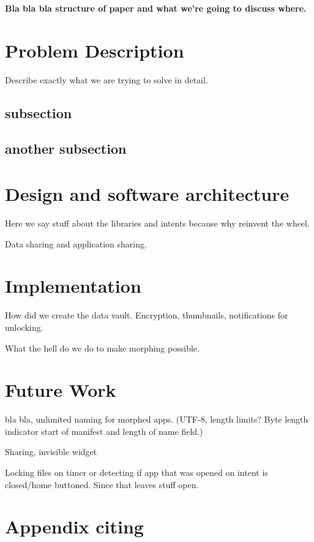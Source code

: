 \documentclass[twocolumn,english,compsoc,journal]{IEEEtran}
\begin{document}
\textbf{Bla bla bla structure of paper and what we're going to discuss
where.}


\section{Problem Description}

Describe exactly what we are trying to solve in detail.


\subsection{subsection}


\subsection{another subsection}


\section{Design and software architecture}

Here we say stuff about the libraries and intents because why reinvent
the wheel.

Data sharing and application sharing.


\section{Implementation}

How did we create the data vault. Encryption, thumbnails, notifications
for unlocking.

What the hell do we do to make morphing possible.


\section{Future Work}

bla bla, unlimited naming for morphed apps. (UTF-8, length limits?
Byte length indicator start of manifest and length of name field.)

Sharing, invisible widget

Locking files on timer or detecting if app that was opened on intent
is closed/home buttoned. Since that leaves stuff open.


\appendices{}


\section{Appendix citing}
\end{document}
